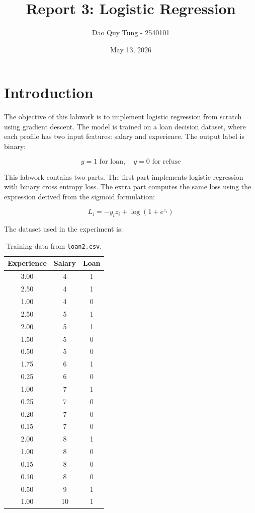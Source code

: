 \documentclass[12pt,a4paper]{article}
\title{Report 3: Logistic Regression}
\author{Dao Quy Tung - 2540101}
\date{May 13, 2026}
\begin{document}
\maketitle

\section{Introduction}

The objective of this labwork is to implement logistic regression from scratch using gradient descent.
The model is trained on a loan decision dataset, where each profile has two input features: salary and experience.
The output label is binary:

\[
y = 1 \text{ for loan}, \quad y = 0 \text{ for refuse}
\]

This labwork contains two parts. The first part implements logistic regression with binary cross entropy loss. The extra part computes the same loss using the expression derived from the sigmoid formulation:

\[
L_i = -y_i z_i + \log(1 + e^{z_i})
\]

The dataset used in the experiment is:

\begin{table}[H]
\centering
\begin{tabular}{ccc}
\toprule
Experience & Salary & Loan \\
\midrule
3.00 & 4 & 1 \\
2.50 & 4 & 1 \\
1.00 & 4 & 0 \\
2.50 & 5 & 1 \\
2.00 & 5 & 1 \\
1.50 & 5 & 0 \\
0.50 & 5 & 0 \\
1.75 & 6 & 1 \\
0.25 & 6 & 0 \\
1.00 & 7 & 1 \\
0.25 & 7 & 0 \\
0.20 & 7 & 0 \\
0.15 & 7 & 0 \\
2.00 & 8 & 1 \\
1.00 & 8 & 0 \\
0.15 & 8 & 0 \\
0.10 & 8 & 0 \\
0.50 & 9 & 1 \\
1.00 & 10 & 1 \\
\bottomrule
\end{tabular}
\caption{Training data from \texttt{loan2.csv}.}
\end{table}
\end{document}
